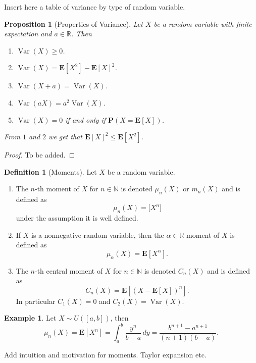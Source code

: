 \documentclass[11pt,a4paper]{article}
\theoremstyle{definition}
\newtheorem{definition}{Definition}[section]
\newtheorem{example}{Example}[section]
\theoremstyle{plain}
\newtheorem{proposition}[theorem]{Proposition}
\DeclareMathOperator{\Var}{Var}
\newcommand{\N}{\mathbb{N}}
\newcommand{\R}{\mathbb{R}}
\begin{document}
  Insert here a table of variance by type of random variable.

  \begin{proposition}[Properties of Variance]
    Let $X$ be a random variable with finite expectation and $a \in \R$. Then
    \begin{enumerate}
      \item $\Var(X) \geq 0$.
      \item $\Var(X) = \mathbf E[X^2] - \mathbf E[X]^2$.
      \item $\Var(X + a) = \Var(X)$.
      \item $\Var(aX) = a^2 \Var(X)$.
      \item $\Var(X) = 0$ if and only if $\mathbf P(X = \mathbf E[X])$.
    \end{enumerate}
    From $1$ and $2$ we get that $\mathbf E[X]^2 \le \mathbf E[X^2]$.
  \end{proposition}
  \begin{proof}
    To be added.
  \end{proof}

  \begin{definition}[Moments]
    Let $X$ be a random variable.
    \begin{enumerate}
      \item The $n$-th moment of $X$ for $n \in \N$ is denoted $\mu_n(X)$ or
      $m_n(X)$ and is defined as
      \[
        \mu_n(X) = \mathbf[X^n]
      \]
      under the assumption it is well defined.
      \item If $X$ is a nonnegative random variable, then the $\alpha \in \R$
      moment of $X$ is defined as
      \[
        \mu_\alpha(X) = \mathbf E[X^{\alpha}].
      \]
      \item The $n$-th central moment of $X$ for $n \in \N$ is denoted
      $C_n(X)$ and is defined as
      \[
        C_n(X) = \mathbf E\left[(X - \mathbf E[X])^n\right].
      \]
      In particular $C_1(X) = 0$ and $C_2(X) = \Var(X)$.
    \end{enumerate}
  \end{definition}

  \begin{example}
    Let $X \sim U([a,b])$, then
    \[
      \mu_{n} \left(X\right) =
      \mathbf{E}[X^{n}] =
      \int_{a}^{b}{\frac{y^{n}}{b-a}}\,dy =
      {\frac{b^{n+1}-a^{n+1}}{(n+1)(b-a)}}.
    \]
  \end{example}
  
  Add intuition and motivation for moments. Taylor expansion etc.
\end{document}
